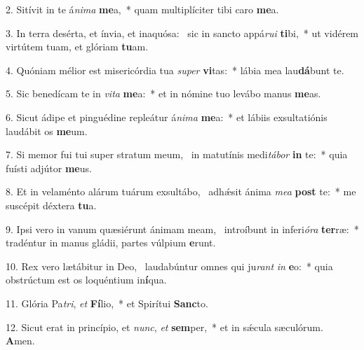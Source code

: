 2. Sitívit in te á\textit{ni}\textit{ma} \textbf{me}a,~*  quam multiplíciter tibi caro \textbf{me}a.\

3. In terra desérta, et ínvia, et inaquósa: \dag\  sic in sancto appá\textit{ru}\textit{i} \textbf{ti}bi,~*  ut vidérem virtútem tuam, et glóriam \textbf{tu}am.\

4. Quóniam mélior est misericórdia tua \textit{su}\textit{per} \textbf{vi}tas:~*  lábia mea lau\textbf{dá}bunt te.\

5. Sic benedícam te in \textit{vi}\textit{ta} \textbf{me}a:~*  et in nómine tuo levábo manus \textbf{me}as.\

6. Sicut ádipe et pinguédine repleátur á\textit{ni}\textit{ma} \textbf{me}a:~*  et lábiis exsultatiónis laudábit os \textbf{me}um.\

7. Si memor fui tui super stratum meum, \dag\  in matutínis medi\textit{tá}\textit{bor} \textbf{in} te:~*  quia fuísti adjútor \textbf{me}us.\

8. Et in velaménto alárum tuárum exsultábo, \dag\  adhǽsit ánima \textit{me}\textit{a} \textbf{post} te:~*  me suscépit déxtera \textbf{tu}a.\

9. Ipsi vero in vanum quæsiérunt ánimam meam, \dag\  introíbunt in inferi\textit{ó}\textit{ra} \textbf{ter}ræ:~*  tradéntur in manus gládii, partes vúlpium \textbf{e}runt.\

10. Rex vero lætábitur in Deo, \dag\  laudabúntur omnes qui ju\textit{rant} \textit{in} \textbf{e}o:~*  quia obstrúctum est os loquéntium in\textbf{í}qua.\

11. Glória Pa\textit{tri}, \textit{et} \textbf{Fí}lio,~*  et Spirítui \textbf{Sanc}to.\

12. Sicut erat in princípio, et \textit{nunc}, \textit{et} \textbf{sem}per,~*  et in sǽcula sæculórum. \textbf{A}men.\

